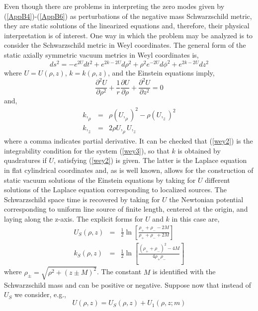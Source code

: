 \documentclass[12pt,aps,floats,showpacs,amssymb,tightenlines]{revtex4}
\begin{document}
Even though there are problems in interpreting the zero modes given
by (\ref{AppB4})-(\ref{AppB6}) as
 perturbations of the negative mass Schwarzschild metric, they are static solutions
  of the linearized equations and, therefore, their physical interpretation is of interest.
  One way in which the problem may be analyzed is to consider the Schwarzschild metric in
   Weyl coordinates. The general form of the static axially symmetric vacuum metrics in Weyl
   coordinates is,
\begin{equation}
\label{wey1}
ds^2=-e^{2U} dt^2+ e^{2k-2U} d\rho^2+\rho^2 e^{-2U} d\phi^2 +e^{2k-2U} dz^2
\end{equation}
where $U=U(\rho,z)$, $k=k(\rho,z)$, and the Einstein equations imply,
\begin{equation}
\label{wey2}
\frac{\partial^2 U}{\partial \rho^2} +\frac{1}{r}
\frac{\partial U}{\partial \rho}+\frac{\partial^2 U}{\partial z^2}=0
\end{equation}
and,
\begin{eqnarray}
\label{wey3}
 k,_{\rho} & = & \rho \left(U,_{\rho}\right)^2-  \rho \left(U,_{z}\right)^2 \nonumber \\
k,_{z} & = & 2 \rho  U,_{\rho}U,_{z}
\end{eqnarray}
where a comma indicates partial derivative.
It can be checked that (\ref{wey2}) is the integrability condition for the system (\ref{wey3}),
so that $k$ is obtained by quadratures if $U$, satisfying (\ref{wey2}) is given. The latter is
the Laplace equation in flat cylindrical coordinates and, as is well known, allows for the
construction of static vacuum solutions of the Einstein equations by taking for $U$ different
 solutions of the Laplace equation corresponding to localized sources. The Schwarzschild space
 time is recovered by taking for $U$ the Newtonian potential corresponding to uniform line
  source of finite length, centered at the origin, and laying along the z-axis. The explicit
   forms for $U$ and $k$ in this case are,
\begin{eqnarray}
\label{wey4}
U_S(\rho,z) & = & \frac{1}{2} \ln\left[\frac{\rho_+ +\rho_- -2M}{\rho_+ +\rho_- +2M}\right] \nonumber \\
k_S(\rho,z)& = &  \frac{1}{2} \ln\left[\frac{(\rho_+ +\rho_-)^2-4M}{ 4 \rho_+ \rho_-}\right]
\end{eqnarray}
where $\rho_{\pm}=\sqrt{\rho^2+(z\pm M)^2}$. The constant $M$ is identified with the Schwarzschild
mass and can be positive or negative. Suppose now that instead of $U_S$ we consider, e.g.,
\begin{equation}
\label{wey5}
U(\rho,z) = U_S(\rho,z)+U_1(\rho,z;m)
\end{equation}
\end{document}
